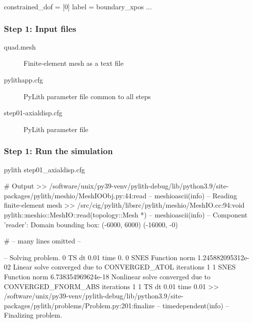\documentclass[aspectratio=169]{beamer}
\begin{document}
\begin{frame}[t,fragile]
\begin{minipage}[t]{0.60\textwidth}
\begin{onlyenv}
\begin{cfgcode}
        constrained_dof = [0]
        label = boundary_xpos
        ...
      \end{cfgcode}
    \end{onlyenv}
  \end{minipage}

    

  
\end{frame}


\begin{frame}
  \frametitle{Step 1: Input files}
  \summary{}

  \begin{description}
  \item[quad.mesh] Finite-element mesh as a text file
  \item[pylithapp.cfg] PyLith parameter file common to all steps
  \item[step01-axialdisp.cfg] PyLith parameter file
  \end{description}
    
\end{frame}


\begin{frame}[fragile]
  \frametitle{Step 1: Run the simulation}
  \summary{}

\begin{bashcode}
pylith step01_axialdisp.cfg

# Output
 >> /software/unix/py39-venv/pylith-debug/lib/python3.9/site-packages/pylith/meshio/MeshIOObj.py:44:read
 -- meshioascii(info)
 -- Reading finite-element mesh
 >> /src/cig/pylith/libsrc/pylith/meshio/MeshIO.cc:94:void pylith::meshio::MeshIO::read(topology::Mesh *)
 -- meshioascii(info)
 -- Component 'reader': Domain bounding box:
    (-6000, 6000)
    (-16000, -0)

# -- many lines omitted --

 -- Solving problem.
0 TS dt 0.01 time 0.
    0 SNES Function norm 1.245882095312e-02 
    Linear solve converged due to CONVERGED_ATOL iterations 1
    1 SNES Function norm 6.738354969624e-18 
  Nonlinear solve converged due to CONVERGED_FNORM_ABS iterations 1
1 TS dt 0.01 time 0.01
 >> /software/unix/py39-venv/pylith-debug/lib/python3.9/site-packages/pylith/problems/Problem.py:201:finalize
 -- timedependent(info)
 -- Finalizing problem.
\end{bashcode}
  
\end{frame}
\end{document}
